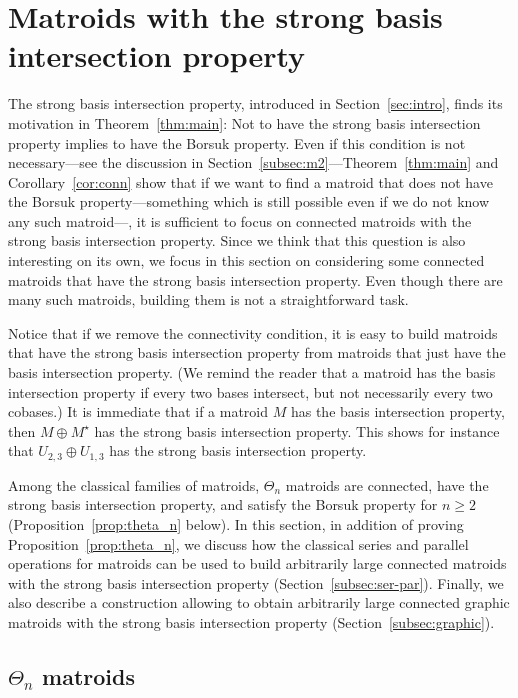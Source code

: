 \documentclass[12pt]{amsart}
\theoremstyle{plain}
\theoremstyle{definition}
\theoremstyle{remark}
\renewcommand{\geq}{\geqslant}
\begin{document}
\section{Matroids with the strong basis intersection property}\label{sec:sbip}

The strong basis intersection property, introduced in Section~\ref{sec:intro}, finds its motivation in Theorem~\ref{thm:main}: Not to have the strong basis intersection property implies to have the Borsuk property. Even if this condition is not necessary---see the discussion in Section~\ref{subsec:m2}---Theorem~\ref{thm:main} and Corollary~\ref{cor:conn} show that if we want to find a matroid that does not have the Borsuk property---something which is still possible even if we do not know any such matroid---, it is sufficient to focus on connected matroids with the strong basis intersection property. Since we think that this question is also interesting on its own, we focus in this section on considering some connected matroids that have the strong basis intersection property. Even though there are many such matroids, building them is not a straightforward task.

Notice that if we remove the connectivity condition, it is easy to build matroids that have the strong basis intersection property from matroids that just have the basis intersection property. (We remind the reader that a matroid has the basis intersection property if every two bases intersect, but not necessarily every two cobases.) It is immediate that if a matroid $M$ has the basis intersection property, then $M \oplus M^\star$ has the strong basis intersection property. This shows for instance that $U_{2,3} \oplus U_{1,3}$ has the strong basis intersection property.

Among the classical families of matroids, $\Theta_n$ matroids are connected, have the strong basis intersection property, and satisfy the Borsuk property for $n\geq 2$ (Proposition~\ref{prop:theta_n} below). In this section, in addition of proving Proposition~\ref{prop:theta_n}, we discuss how the classical series and parallel operations for matroids can be used to build arbitrarily large connected matroids with the strong basis intersection property (Section~\ref{subsec:ser-par}). Finally, we also describe a construction allowing to obtain arbitrarily large connected graphic matroids with the strong basis intersection property (Section~\ref{subsec:graphic}).

\subsection{$\Theta_n$ matroids}\label{subsec:theta_n}
\end{document}
